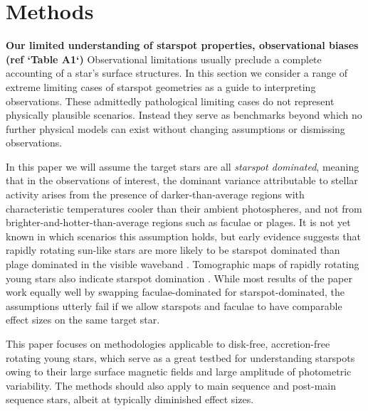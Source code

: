 \documentclass[twocolumn]{emulateapj}%
\begin{document}
\section{Methods}\label{sec:methods}

\textbf{Our limited understanding of starspot properties, observational biases (ref `Table A1`)}
Observational limitations usually preclude a complete accounting of a star's surface structures.  In this section we consider a range of extreme limiting cases of starspot geometries as a guide to interpreting observations.  These admittedly pathological limiting cases do not represent physically plausible scenarios.  Instead they serve as benchmarks beyond which no further physical models can exist without changing assumptions or dismissing observations.

In this paper we will assume the target stars are all \emph{starspot dominated}, meaning that in the observations of interest, the dominant variance attributable to stellar activity arises from the presence of darker-than-average regions with characteristic temperatures cooler than their ambient photospheres, and not from brighter-and-hotter-than-average regions such as faculae or plages.  It is not yet known in which scenarios this assumption holds, but early evidence suggests that rapidly rotating sun-like stars are more likely to be starspot dominated than plage dominated in the visible waveband \citep{2017ApJ...851..116M}.  Tomographic maps of rapidly rotating young stars also indicate starspot domination \citep{donati14}.  While most results of the paper work equally well by swapping faculae-dominated for starspot-dominated, the assumptions utterly fail if we allow starspots and faculae to have comparable effect sizes on the same target star.

This paper focuses on methodologies applicable to disk-free, accretion-free rotating young stars, which serve as a great testbed for understanding starspots owing to their large surface magnetic fields and large amplitude of photometric variability.  The methods should also apply to main sequence and post-main sequence stars, albeit at typically diminished effect sizes.
\end{document}
